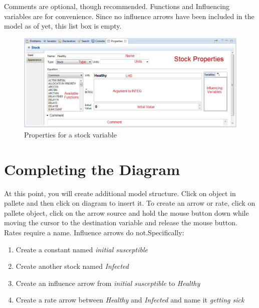 \documentclass[11pt]{amsart}
\begin{document}
Comments are optional, though recommended.  Functions and Influencing variables are for convenience. Since no influence arrows have been included in the model as of yet, this list box is empty.






\begin{figure}[ht]
\begin{center}
\vspace{.2in}
\centerline {
\includegraphics[totalheight=0.4\textheight]{images/013.jpg}
}
\caption{Properties for a stock variable}
\label{fig:013}
\end{center}
\end{figure}

\clearpage

\section{Completing the Diagram}
At this point, you will create additional model structure. Click on object in pallete and then click on diagram to insert it. To create an arrow or rate, click on pallete object, click on the arrow source and hold the mouse button down while moving the cursor to the destination variable and release the mouse button. Rates require a name. Influence arrows do not.Specifically:

\begin{enumerate}
\item Create a constant named \textit{initial susceptible}
\item Create another stock named \textit{Infected}
\item Create an influence arrow from \textit{initial susceptible} to \textit{Healthy}
\item Create a rate arrow between \textit{Healthy} and \textit{Infected} and name it \textit{getting sick}
\end{enumerate}
\vspace{.2in}
\end{document}
